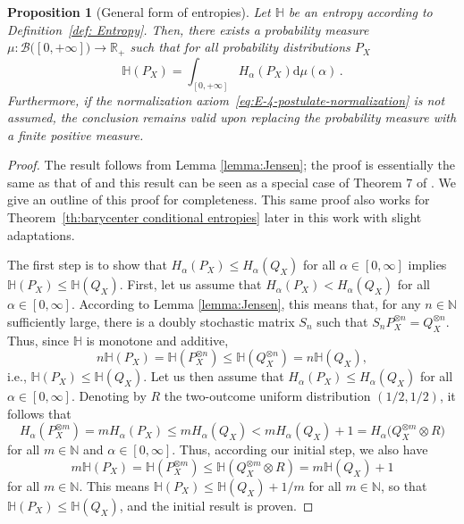 \documentclass[aps,pra,11pt,onecolumn,nofootinbib,tightenlines]{revtex4-2}
\newtheorem{proposition}[theorem]{Proposition}
\theoremstyle{definition}
\def \d {\mathrm{d}}
\renewcommand{\H}{\mathbb{H}}
\newcommand{\mc}[1]{\mathcal{#1}}
\newcommand{\mb}[1]{\mathbb{#1}}
\begin{document}
\begin{proposition}[General form of entropies]\label{proposition:barycenter entropies}
Let $\H$ be an entropy according to Definition~\ref{def: Entropy}. Then, there exists a probability measure $\mu:\mc B\big([0,+\infty]\big)\to\mb R_+$ such that for all probability distributions $P_X$
\begin{equation}\label{eq:barycenter}
\H(P_X)=\int_{[0,+\infty]}H_\alpha(P_X)\d\mu(\alpha) \,.
\end{equation}
Furthermore, if the normalization axiom~\ref{eq:E-4-postulate-normalization} is not assumed, the conclusion remains valid upon replacing the probability measure with a finite positive measure.
\end{proposition}
\begin{proof}
    The result follows from Lemma \ref{lemma:Jensen}; the proof is essentially the same as that of \cite[Theorem 2]{mu21_renyi} and this result can be seen as a special case of Theorem 7 of \cite{haapasalo_inprep}. We give an outline of this proof for completeness. This same proof also works for Theorem~\ref{th:barycenter conditional entropies} later in this work with slight adaptations.

    The first step is to show that $H_\alpha(P_X)\leq H_\alpha(Q_X)$ for all $\alpha\in[0,\infty]$ implies $\mb H(P_X)\leq\mb H(Q_X)$. First, let us assume that $H_\alpha(P_X)< H_\alpha(Q_X)$ for all $\alpha\in[0,\infty]$. According to Lemma \ref{lemma:Jensen}, this means that, for any $n\in\mb N$ sufficiently large, there is a doubly stochastic matrix $S_n$ such that $S_nP_X^{\otimes n}=Q_X^{\otimes n}$. Thus, since $\mb H$ is monotone and additive,
    \begin{equation}
    n\mb H(P_X)=\mb H(P_X^{\otimes n})\leq\mb H(Q_X^{\otimes n})=n\mb H(Q_X),
    \end{equation}
    i.e., $\mb H(P_X)\leq\mb H(Q_X)$. Let us then assume that $H_\alpha(P_X)\leq H_\alpha(Q_X)$ for all $\alpha\in[0,\infty]$. Denoting by $R$ the two-outcome uniform distribution $(1/2,1/2)$, it follows that
    \begin{equation}
    H_\alpha(P_X^{\otimes m})=mH_\alpha(P_X)\leq mH_\alpha(Q_X)<mH_\alpha(Q_X)+1=H_\alpha(Q_X^{\otimes m}\otimes R\big)
    \end{equation}
    for all $m\in\mb N$ and $\alpha\in[0,\infty]$. Thus, according our initial step, we also have
    \begin{equation}
    m\mb H(P_X)=\mb H(P_X^{\otimes m})\leq\mb H(Q_X^{\otimes m}\otimes R)=m\mb H(Q_X)+1
    \end{equation}
    for all $m\in\mb N$. This means $\mb H(P_X)\leq\mb H(Q_X)+1/m$ for all $m\in\mb N$, so that $\mb H(P_X)\leq\mb H(Q_X)$, and the initial result is proven.


\end{proof}
\end{document}
